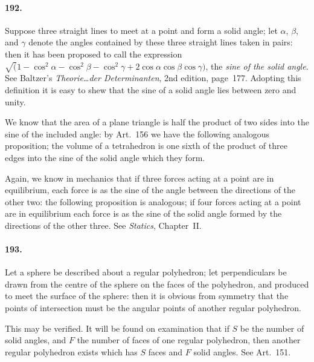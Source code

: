 \documentclass{book}[2004/02/16]
\begin{document}
\begin{mainmatter}
\begin{spacing}{1.3}
\paragraph{192.} Suppose three straight lines to meet at a point and form
a solid angle; let $\alpha$, $\beta$, and $\gamma$ denote the angles contained by these
three straight lines taken in pairs: then it has been proposed to
call the expression $\surd(1-\cos^2 \alpha-\cos^2 \beta-\cos^2 \gamma+2\cos \alpha \cos \beta \cos \gamma)$,
the \textit{sine of the solid angle}. See Baltzer's \textit{Theorie\ldots der Determinanten},
2nd edition, page~177. Adopting this definition it is easy
to shew that the sine of a solid angle lies between zero and unity.

We know that the area of a plane triangle is half the product
of two sides into the sine of the included angle: by Art.\ 156 we
have the following analogous proposition; the volume of a tetrahedron
is one sixth of the product of three edges into the sine of
the solid angle which they form.

Again, we know in mechanics that if three forces acting at a
point are in equilibrium, each force is as the sine of the angle
between the directions of the other two: the following proposition
is analogous; if four forces acting at a point are in equilibrium
each force is as the sine of the solid angle formed by the directions
of the other three. See \textit{Statics}, Chapter~II\@.

\paragraph{193.} Let a sphere be described about a regular polyhedron;
let perpendiculars be drawn from the centre of the sphere on the
faces of the polyhedron, and produced to meet the surface of
the sphere: then it is obvious from symmetry that the points of
intersection must be the angular points of another regular polyhedron.

This may be verified. It will be found on examination that if
$S$ be the number of solid angles, and $F$ the number of faces of one
regular polyhedron, then another regular polyhedron exists which
has $S$ faces and $F$ solid angles. See Art.~151.


\end{spacing}
\end{mainmatter}
\end{document}
